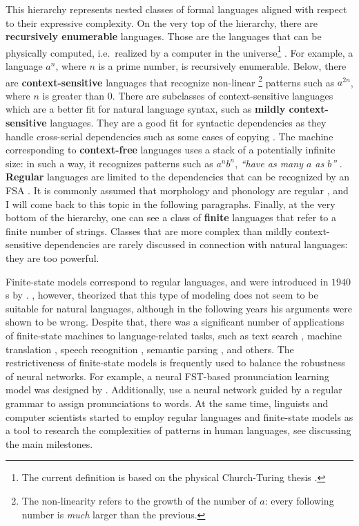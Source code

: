 This hierarchy represents nested classes of formal languages aligned with respect to their expressive complexity.
On the very top of the hierarchy, there are \textbf{recursively enumerable} languages.
Those are the languages that can be physically computed, i.e.\ realized by a computer in the universe\footnote{The current definition is based on the physical Church-Turing thesis \citep{Church1936,Turing1937a,Turing1937b}.} \citep{Chomsky1956}.
For example, a language $a^{n}$, where $n$ is a prime number, is recursively enumerable.
Below, there are \textbf{context-sensitive} languages that recognize non-linear%
\footnote{The non-linearity refers to the growth of the number of $a$: every following number is \emph{much} larger than the previous.}
 patterns such as $a^{2n}$, where $n$ is greater than $0$.
There are subclasses of context-sensitive languages which are a better fit for natural language syntax, such as \textbf{mildly context-sensitive} languages.
They are a good fit for syntactic dependencies as they handle cross-serial dependencies such as some cases of copying \citep{Joshi1985,Shieber1985,Kallmeyer2010}.
The machine corresponding to \textbf{context-free} languages uses a stack of a potentially infinite size: in such a way, it recognizes patterns such as $a^{n}b^{n}$, \emph{``have as many $a$ as $b$''} \citep{HopcroftEtAl2006}.
\textbf{Regular} languages are limited to the dependencies that can be recognized by an FSA \citep{HopcroftEtAl2006}.
It is commonly assumed that morphology and phonology are regular \citep{Johnson1972,KaplanKay94,BeesleyKartunnen03,RoarkSproat2007}, and I will come back to this topic in the following paragraphs.
Finally, at the very bottom of the hierarchy, one can see a class of \textbf{finite} languages that refer to a finite number of strings.
Classes that are more complex than mildly context-sensitive dependencies are rarely discussed in connection with natural languages: they are too powerful.

Finite-state models correspond to regular languages, and were introduced in $1940$s by \citeauthor{McCullochPitts1943}.
\cite{Chomsky1956}, however, theorized that this type of modeling does not seem to be suitable for natural languages, although in the following years his arguments were shown to be wrong.
Despite that, there was a significant number of applications of finite-state machines to language-related tasks, such as text search \citep{Thompson1968}, machine translation \citep{OncinaEtAl1994,KnightAlOnaizan1998,BangaloreRiccardi2002}, speech recognition \citep{Caseiro2003,MohriPereiraRiley2002,MohriPereiraRiley2008}, semantic parsing \citep{JonesJohnsonGoldwater2011,JonesJohnsonGoldwater2012}, and others.
The restrictiveness of finite-state models is frequently used to balance the robustness of neural networks.
For example, a neural FST-based pronunciation learning model was designed by \cite{Bruguier2017PronunciationLW}.
Additionally, \cite{RoarkEtAl2019} use a neural network guided by a regular grammar to assign pronunciations to words.
At the same time, linguists and computer scientists started to employ regular languages and finite-state models as a tool to research the complexities of patterns in human languages, see \cite{Hulden2014} discussing the main milestones.



